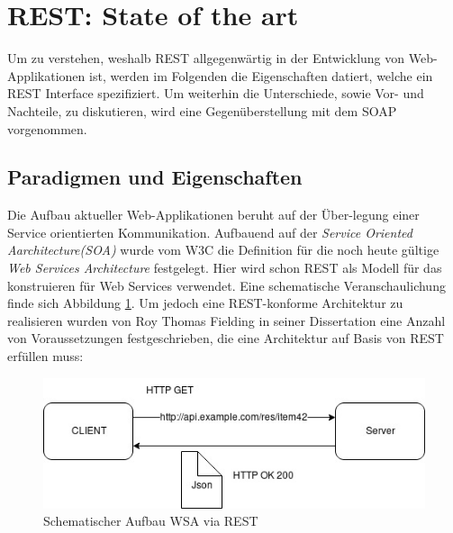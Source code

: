 \documentclass[fleqn,10.5pt,ngerman]{SelfArx}
\begin{document}

\section{REST: State of the art}
Um zu verstehen, weshalb REST allgegenwärtig in der Entwicklung von Web-Applikationen ist, werden im Folgenden die Eigenschaften datiert, welche ein REST Interface spezifiziert. Um weiterhin die Unterschiede, sowie Vor- und Nachteile, zu diskutieren, wird eine Gegenüberstellung mit dem SOAP vorgenommen. 

\subsection{Paradigmen und Eigenschaften}
Die Aufbau aktueller Web-Applikationen beruht auf der Über-legung einer Service orientierten Kommunikation. Aufbauend auf der \textit{Service Oriented Aarchitecture(SOA)} wurde vom W3C die Definition für die noch heute gültige \textit{Web Services Architecture} \cite{WSA} festgelegt. Hier wird schon REST als Modell für das konstruieren für Web Services verwendet. Eine schematische Veranschaulichung finde sich Abbildung \ref{fig:rest}. Um jedoch eine REST-konforme Architektur zu realisieren wurden von Roy Thomas Fielding in seiner Dissertation \cite{Fielding:2000} eine Anzahl von Voraussetzungen festgeschrieben, die eine Architektur auf Basis von REST erfüllen muss:
\begin{figure}[ht]\centering
	\includegraphics[width=8.5 cm]{Abbildungen/restcommunication.jpg}
	\caption{Schematischer Aufbau WSA via REST}
	\label{fig:rest}
\end{figure}
\end{document}
